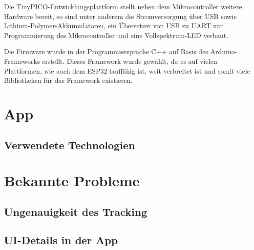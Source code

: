 Die TinyPICO-Entwicklungsplattform stellt neben dem Mikrocontroller weitere Hardware bereit, so sind
unter anderem
die Stromversorgung über \gls{USB} sowie Lithium-Polymer-Akkumulatoren, ein Übersetzer von \gls{USB}
zu \gls{UART} zur Programmierung des Mikrocontroller und eine Vollspektrum-\gls{LED} verbaut.


Die Firmware wurde in der Programmiersprache C++ auf Basis des Arduino-Frameworks erstellt. Dieses
Framework wurde gewählt, da es auf vielen Plattformen, wie auch dem ESP32 lauffähig ist, weit
verbreitet ist und somit viele Bibliotheken für das Framework existieren.


\section{App}

\subsection{Verwendete Technologien}


\section{Bekannte Probleme}
\subsection{Ungenauigkeit des Tracking}

\subsection{UI-Details in der App}
